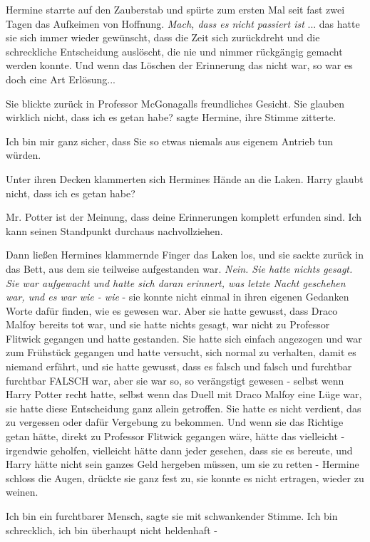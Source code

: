 Hermine starrte auf den Zauberstab und spürte zum ersten Mal seit fast zwei
Tagen das Aufkeimen von Hoffnung. \emph{Mach, dass es nicht passiert ist }...
das hatte sie sich immer wieder gewünscht, dass die Zeit sich zurückdreht und
die schreckliche Entscheidung auslöscht, die nie und nimmer rückgängig gemacht
werden konnte. Und wenn das Löschen der Erinnerung das nicht war, so war es doch
eine Art Erlösung...

Sie blickte zurück in Professor McGonagalls freundliches Gesicht. \glqq Sie
glauben wirklich nicht, dass ich es getan habe?\grqq{} sagte Hermine, ihre
Stimme zitterte.

\glqq Ich bin mir ganz sicher, dass Sie so etwas niemals aus eigenem Antrieb tun
würden.\grqq{}

Unter ihren Decken klammerten sich Hermines Hände an die Laken. \glqq Harry
glaubt nicht, dass ich es getan habe?\grqq{}

\glqq Mr. Potter ist der Meinung, dass deine Erinnerungen komplett erfunden
sind. Ich kann seinen Standpunkt durchaus nachvollziehen.\grqq{}

Dann ließen Hermines klammernde Finger das Laken los, und sie sackte zurück in
das Bett, aus dem sie teilweise aufgestanden war. \emph{Nein. Sie hatte nichts
gesagt. Sie war aufgewacht und hatte sich daran erinnert, was letzte Nacht
geschehen war, und es war wie - wie} - sie konnte nicht einmal in ihren eigenen
Gedanken Worte dafür finden, wie es gewesen war. Aber sie hatte gewusst, dass
Draco Malfoy bereits tot war, und sie hatte nichts gesagt, war nicht zu
Professor Flitwick gegangen und hatte gestanden. Sie hatte sich einfach
angezogen und war zum Frühstück gegangen und hatte versucht, sich normal zu
verhalten, damit es niemand erfährt, und sie hatte gewusst, dass es falsch und
falsch und furchtbar furchtbar FALSCH war, aber sie war so, so verängstigt
gewesen - selbst wenn Harry Potter recht hatte, selbst wenn das Duell mit Draco
Malfoy eine Lüge war, sie hatte diese Entscheidung ganz allein getroffen. Sie
hatte es nicht verdient, das zu vergessen oder dafür Vergebung zu bekommen. Und
wenn sie das Richtige getan hätte, direkt zu Professor Flitwick gegangen wäre,
hätte das vielleicht - irgendwie geholfen, vielleicht hätte dann jeder gesehen,
dass sie es bereute, und Harry hätte nicht sein ganzes Geld hergeben müssen, um
sie zu retten - Hermine schloss die Augen, drückte sie ganz fest zu, sie konnte
es nicht ertragen, wieder zu weinen.

\glqq Ich bin ein furchtbarer Mensch\grqq{}, sagte sie mit schwankender Stimme.
\glqq Ich bin schrecklich, ich bin überhaupt nicht heldenhaft -\grqq{}

